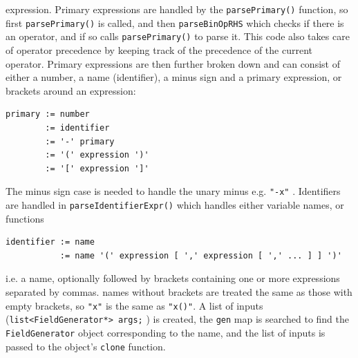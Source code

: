 \documentclass[12pt]{article}
\begin{document}
expression. Primary expressions are handled by the
%
\lstinline!parsePrimary()! function, so first \lstinline!parsePrimary()!
%
 is called, and then
%
\lstinline!parseBinOpRHS! which checks if there is an operator, and if so calls
\lstinline!parsePrimary()!
%
 to parse it. This code also takes care of operator precedence by keeping track
 of the precedence of the current operator. Primary expressions are then
 further broken down and can consist of either a number, a name (identifier), a
 minus sign and a primary expression, or brackets around an  expression:
%
\begin{verbatim}
primary := number
        := identifier
        := '-' primary
        := '(' expression ')'
        := '[' expression ']'
\end{verbatim}
%
The minus sign case is needed to handle the unary minus e.g.
%
\lstinline!"-x"!
%
. Identifiers are handled in
%
\lstinline!parseIdentifierExpr()!
%
 which handles either variable names, or functions
%
\begin{verbatim}
identifier := name
           := name '(' expression [ ',' expression [ ',' ... ] ] ')'
\end{verbatim}
%
i.e. a name, optionally followed by brackets containing one or more expressions
separated by commas.  names without brackets are treated the same as those with
empty brackets, so
%
\lstinline!"x"!
%
 is the same as
%
\lstinline!"x()"!. A list of inputs (\lstinline!list<FieldGenerator*> args;!
%
) is created, the
%
\lstinline!gen! map is searched to find the \lstinline!FieldGenerator!
%
 object corresponding to the name, and the list of inputs is passed to the
 object's
%
\lstinline!clone!
%
 function.
\end{document}
